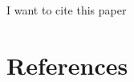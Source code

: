 \documentclass[a4paper,11pt]{report}
\begin{document}
	
	


















\cite{ergen2012signal}

I want to cite this paper \cite{cui2015application}




\newpage
\section*{References}
 

\end{document}
